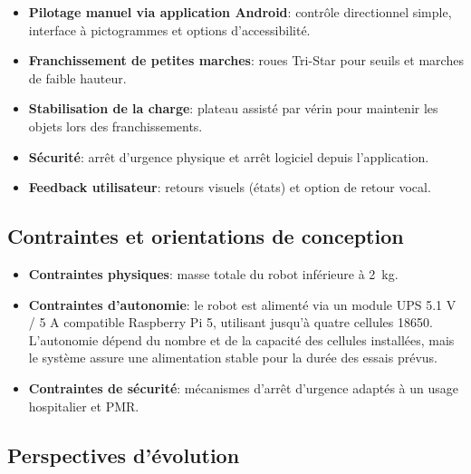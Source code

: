 \documentclass[12pt,a4paper]{article}
\begin{document}
\begin{itemize}
    \item \textbf{Pilotage manuel via application Android}:
    contrôle directionnel simple, interface à pictogrammes et options d’accessibilité.

    \item \textbf{Franchissement de petites marches}:
    roues Tri-Star pour seuils et marches de faible hauteur.

    \item \textbf{Stabilisation de la charge}:
    plateau assisté par vérin pour maintenir les objets lors des franchissements.

    \item \textbf{Sécurité}:
    arrêt d’urgence physique et arrêt logiciel depuis l’application.

    \item \textbf{Feedback utilisateur}:
    retours visuels (états) et option de retour vocal.
\end{itemize}

\subsection{Contraintes et orientations de conception}

\begin{itemize}
    \item \textbf{Contraintes physiques}: masse totale du robot inférieure à 2~kg.
    \item \textbf{Contraintes d’autonomie}: le robot est alimenté via un module UPS 5.1 V / 5 A compatible Raspberry Pi 5, utilisant jusqu’à quatre cellules 18650. L’autonomie dépend du nombre et de la capacité des cellules installées, mais le système assure une alimentation stable pour la durée des essais prévus.
    \item \textbf{Contraintes de sécurité}: mécanismes d’arrêt d’urgence adaptés à un usage hospitalier et PMR.
\end{itemize}

\subsection{Perspectives d’évolution}
\end{document}
